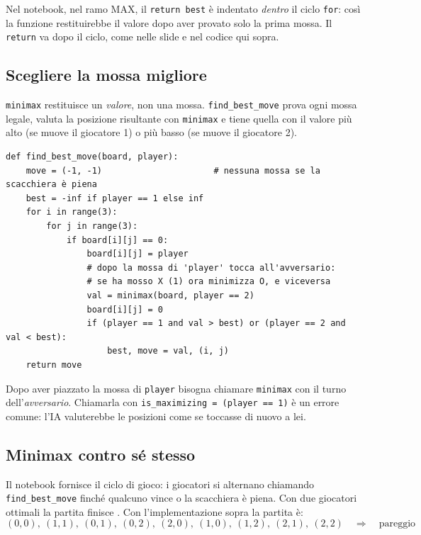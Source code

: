 \begin{attenzione}
Nel notebook, nel ramo MAX, il \texttt{return best} è indentato \emph{dentro} il ciclo
\texttt{for}: così la funzione restituirebbe il valore dopo aver provato solo la prima mossa.
Il \texttt{return} va dopo il ciclo, come nelle slide e nel codice qui sopra.
\end{attenzione}

\subsection{Scegliere la mossa migliore}

\texttt{minimax} restituisce un \emph{valore}, non una mossa. \texttt{find\_best\_move} prova
ogni mossa legale, valuta la posizione risultante con \texttt{minimax} e tiene quella con il
valore più alto (se muove il giocatore 1) o più basso (se muove il giocatore 2).

\begin{lstlisting}
def find_best_move(board, player):
    move = (-1, -1)                      # nessuna mossa se la scacchiera è piena
    best = -inf if player == 1 else inf
    for i in range(3):
        for j in range(3):
            if board[i][j] == 0:
                board[i][j] = player
                # dopo la mossa di 'player' tocca all'avversario:
                # se ha mosso X (1) ora minimizza O, e viceversa
                val = minimax(board, player == 2)
                board[i][j] = 0
                if (player == 1 and val > best) or (player == 2 and val < best):
                    best, move = val, (i, j)
    return move
\end{lstlisting}

\begin{attenzione}
Dopo aver piazzato la mossa di \texttt{player} bisogna chiamare \texttt{minimax} con il turno
dell'\emph{avversario}. Chiamarla con \texttt{is\_maximizing = (player == 1)} è un errore comune:
l'IA valuterebbe le posizioni come se toccasse di nuovo a lei.
\end{attenzione}

\subsection{Minimax contro sé stesso}

Il notebook fornisce il ciclo di gioco: i giocatori si alternano chiamando
\texttt{find\_best\_move} finché qualcuno vince o la scacchiera è piena. Con due giocatori
ottimali la partita finisce . Con l'implementazione sopra la partita è:
\[
(0,0),\ (1,1),\ (0,1),\ (0,2),\ (2,0),\ (1,0),\ (1,2),\ (2,1),\ (2,2)
\quad\Rightarrow\quad \text{pareggio}
\]

